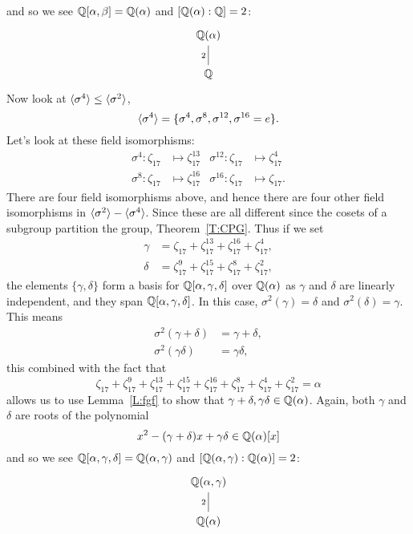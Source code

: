 \documentclass{ximera}
\begin{document}
\begin{example}
\[  \]
  and so we see $\mathbb Q[\alpha,\beta]= \mathbb Q(\alpha)$ and $[\mathbb Q(\alpha):\mathbb Q] =
  2$:
  \[
  \begin{tikzcd}
    \Q(\alpha) \\ \Q \ar[u,-,"2"]
  \end{tikzcd}
  \]
  Now look at $\langle\sigma^4\rangle\leq \langle \sigma^2\rangle$,
  \[
  \langle\sigma^4\rangle = \{ \sigma^4, \sigma^8,\sigma^{12},\sigma^{16} = e\}.
  \]
  Let's look at these field isomorphisms:
  \begin{align*}
    \sigma^4: \zeta_{17} &\mapsto \zeta_{17}^{13}    & \sigma^{12}: \zeta_{17} &\mapsto \zeta_{17}^{4}\\
    \sigma^8: \zeta_{17} &\mapsto \zeta_{17}^{16} & \sigma^{16}: \zeta_{17} &\mapsto \zeta_{17}.
  \end{align*}
  There are four field isomorphisms above, and hence there are four
  other field isomorphisms in $\langle\sigma^2\rangle - \langle \sigma^4\rangle$. Since 
  these are all different since the cosets of a subgroup partition the
  group, Theorem~\ref{T:CPG}. Thus if we set
  \begin{align*}
    \gamma &= \zeta_{17}   + \zeta_{17}^{13} + \zeta_{17}^{16} + \zeta_{17}^{4},\\
    \delta &= \zeta_{17}^9 + \zeta_{17}^{15} + \zeta_{17}^{8} + \zeta_{17}^{2},
  \end{align*}
  the elements $\{\gamma,\delta\}$ form a basis for
  $\mathbb Q[\alpha,\gamma,\delta]$ over $\mathbb Q(\alpha)$ as $\gamma$ and
  $\delta$ are linearly independent, and they span
  $\mathbb Q[\alpha,\gamma,\delta]$.  In this case, $\sigma^2(\gamma)= \delta$ and
  $\sigma^2(\delta) = \gamma$. This means
  \begin{align*}
    \sigma^2(\gamma+\delta) &= \gamma + \delta,\\
    \sigma^2(\gamma\delta) &= \gamma\delta,
  \end{align*}
  this combined with the fact that
  \[
   \zeta_{17} + \zeta_{17}^9 + \zeta_{17}^{13} + \zeta_{17}^{15} +
   \zeta_{17}^{16} + \zeta_{17}^{8} + \zeta_{17}^{4} + \zeta_{17}^{2}
   = \alpha
  \]
  allows us to use Lemma~\ref{L:fgf} to show that
  $\gamma+\delta,\gamma\delta\in\mathbb Q(\alpha)$. Again, both $\gamma$ and
  $\delta$ are roots of the polynomial
  \[
  x^2 - (\gamma +\delta) x + \gamma\delta\in\mathbb Q(\alpha)[x]
  \]
  and so we see $\mathbb Q[\alpha,\gamma,\delta] = \mathbb Q(\alpha,\gamma)$ and
  $[\mathbb Q(\alpha,\gamma):\mathbb Q(\alpha)] = 2$:
  \[
  \begin{tikzcd}
    \Q(\alpha,\gamma)\\
    \Q(\alpha) \ar[u,-,"2"]\\

\end{tikzcd}\]
\end{example}
\end{document}
